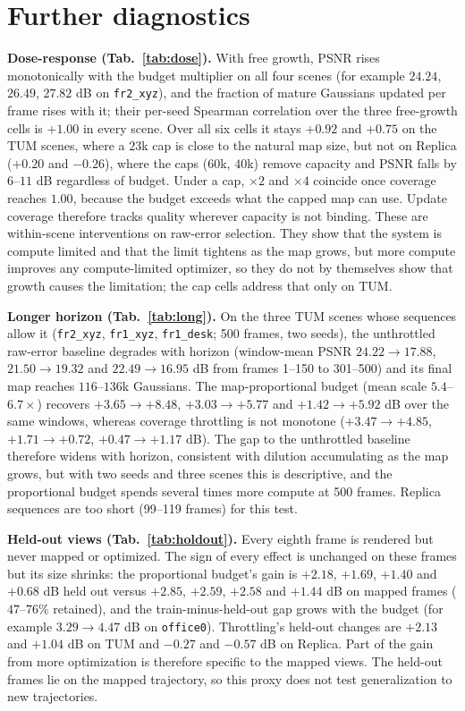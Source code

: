 \documentclass[10pt,twocolumn,letterpaper]{article}
\begin{document}
\section{Further diagnostics}
\textbf{Dose-response (Tab.~\ref{tab:dose}).}
With free growth, PSNR rises monotonically with the budget multiplier on all four scenes (for example $24.24$, $26.49$, $27.82$ dB on \texttt{fr2\_xyz}), and the fraction of mature Gaussians updated per frame rises with it; their per-seed Spearman correlation over the three free-growth cells is $+1.00$ in every scene. Over all six cells it stays $+0.92$ and $+0.75$ on the TUM scenes, where a $23$k cap is close to the natural map size, but not on Replica ($+0.20$ and $-0.26$), where the caps ($60$k, $40$k) remove capacity and PSNR falls by $6$--$11$ dB regardless of budget. Under a cap, $\times2$ and $\times4$ coincide once coverage reaches $1.00$, because the budget exceeds what the capped map can use. Update coverage therefore tracks quality wherever capacity is not binding. These are within-scene interventions on raw-error selection. They show that the system is compute limited and that the limit tightens as the map grows, but more compute improves any compute-limited optimizer, so they do not by themselves show that growth causes the limitation; the cap cells address that only on TUM.


\textbf{Longer horizon (Tab.~\ref{tab:long}).}
On the three TUM scenes whose sequences allow it (\texttt{fr2\_xyz}, \texttt{fr1\_xyz}, \texttt{fr1\_desk}; 500 frames, two seeds), the unthrottled raw-error baseline degrades with horizon (window-mean PSNR $24.22\to17.88$, $21.50\to19.32$ and $22.49\to16.95$ dB from frames 1--150 to 301--500) and its final map reaches $116$--$136$k Gaussians. The map-proportional budget (mean scale $5.4$--$6.7\times$) recovers $+3.65\to+8.48$, $+3.03\to+5.77$ and $+1.42\to+5.92$ dB over the same windows, whereas coverage throttling is not monotone ($+3.47\to+4.85$, $+1.71\to+0.72$, $+0.47\to+1.17$ dB). The gap to the unthrottled baseline therefore widens with horizon, consistent with dilution accumulating as the map grows, but with two seeds and three scenes this is descriptive, and the proportional budget spends several times more compute at 500 frames. Replica sequences are too short (99--119 frames) for this test.


\textbf{Held-out views (Tab.~\ref{tab:holdout}).}
Every eighth frame is rendered but never mapped or optimized. The sign of every effect is unchanged on these frames but its size shrinks: the proportional budget's gain is $+2.18$, $+1.69$, $+1.40$ and $+0.68$ dB held out versus $+2.85$, $+2.59$, $+2.58$ and $+1.44$ dB on mapped frames ($47$--$76\%$ retained), and the train-minus-held-out gap grows with the budget (for example $3.29\to4.47$ dB on \texttt{office0}). Throttling's held-out changes are $+2.13$ and $+1.04$ dB on TUM and $-0.27$ and $-0.57$ dB on Replica. Part of the gain from more optimization is therefore specific to the mapped views. The held-out frames lie on the mapped trajectory, so this proxy does not test generalization to new trajectories.

\end{document}
